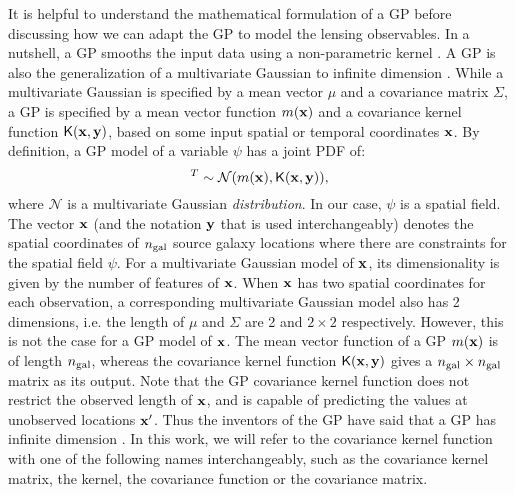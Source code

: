 It is helpful to understand the mathematical formulation of a GP
before discussing how we can adapt the GP to model the lensing observables. 
In a nutshell, a GP smooths the input data using a non-parametric kernel
\citep{Hastie1990}. 
A GP is also the generalization of a multivariate Gaussian 
to infinite dimension \citep{Rasmussen2006}. While a multivariate Gaussian is
specified by a mean vector $\mu$ and a covariance matrix $\Sigma$, 
a GP is specified by a mean vector function $m(\mathbf{x})$ and a
covariance kernel function $\mathsf{K}(\mathbf{x}, \mathbf{y})$, based on some input spatial or
temporal coordinates $\mathbf{x}$. 
By definition, a GP model of a variable $\psi$ has a joint
PDF of:
\begin{equation}
	[\psi_1, \psi_2, \ldots, \psi_m ]^T \sim \mathcal{N}(m(\xv),
	\kerngp(\xv, \yv)),\label{eq:GP_joint_distribution}
\end{equation}
where $\mathcal{N}$ is a multivariate Gaussian {\it distribution}.
In our case, $\psi$ is a spatial field. The vector $\mathbf{x}$ (and the
notation $\mathbf{y}$ that is used interchangeably) denotes the
spatial coordinates of $n_{\rm gal}$ source galaxy locations where there are
constraints for the spatial field $\psi$. 
For a multivariate Gaussian model of $\mathbf{x}$, 
its dimensionality is given by the number of features of $\mathbf{x}$.
When $\mathbf{x}$ has two spatial coordinates for each observation, 
a corresponding multivariate Gaussian model also has 2 dimensions, 
i.e. the length of $\mu$ and $\Sigma$ are 2 and $2 \times 2$ respectively. 
However, this is not the case for a GP model of $\mathbf{x}$. 
The mean vector function of a GP $m(\mathbf{x})$ is of length $n_{\rm gal}$, 
whereas the covariance kernel function $\mathsf{K}(\mathbf{x}, \mathbf{y})$
gives a $n_{\rm gal} \times n_{\rm gal}$ matrix as its output.
Note that the GP covariance kernel function does not restrict the 
observed length of $\mathbf{x}$, and is capable of predicting the values at
unobserved locations $\mathbf{x}'$. Thus the inventors of the GP 
have said that a GP has infinite dimension \citep{Rasmussen2006}. 
In this work, we will refer to the covariance kernel function with one of 
the following names interchangeably, such as the 
covariance kernel matrix, the kernel, the covariance
function or the covariance matrix. 


